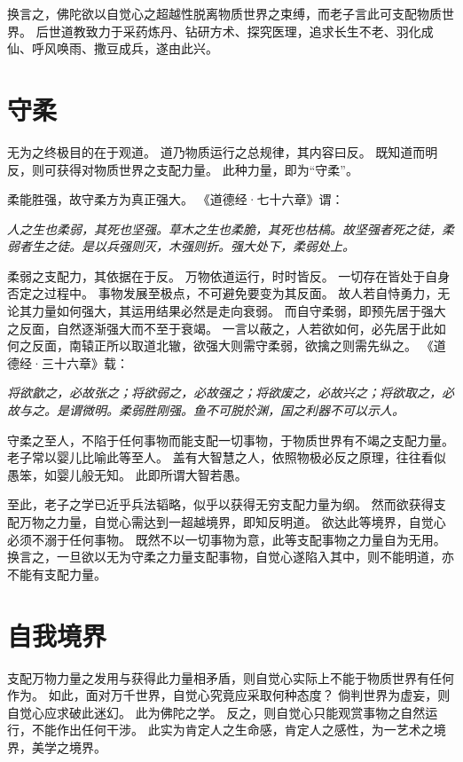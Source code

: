 \documentclass[11pt]{article}
\begin{document}
换言之，佛陀欲以自觉心之超越性脱离物质世界之束缚，而老子言此可支配物质世界。
后世道教致力于采药炼丹、钻研方术、探究医理，追求长生不老、羽化成仙、呼风唤雨、撒豆成兵，遂由此兴。
  
\section{守柔}
无为之终极目的在于观道。
道乃物质运行之总规律，其内容曰反。
既知道而明反，则可获得对物质世界之支配力量。
此种力量，即为“守柔”。

\par

柔能胜强，故守柔方为真正强大。
《道德经·七十六章》谓：

\textit{人之生也柔弱，其死也坚强。草木之生也柔脆，其死也枯槁。故坚强者死之徒，柔弱者生之徒。是以兵强则灭，木强则折。强大处下，柔弱处上。}

\par

柔弱之支配力，其依据在于反。
万物依道运行，时时皆反。
一切存在皆处于自身否定之过程中。
事物发展至极点，不可避免要变为其反面。
故人若自恃勇力，无论其力量如何强大，其运用结果必然是走向衰弱。
而自守柔弱，即预先居于强大之反面，自然逐渐强大而不至于衰竭。
一言以蔽之，人若欲如何，必先居于此如何之反面，南辕正所以取道北辙，欲强大则需守柔弱，欲擒之则需先纵之。
《道德经·三十六章》载：

\textit{将欲歙之，必故张之；将欲弱之，必故强之；将欲废之，必故兴之；将欲取之，必故与之。是谓微明。柔弱胜刚强。鱼不可脱於渊，国之利器不可以示人。}
  
\par

守柔之至人，不陷于任何事物而能支配一切事物，于物质世界有不竭之支配力量。
老子常以婴儿比喻此等至人。
盖有大智慧之人，依照物极必反之原理，往往看似愚笨，如婴儿般无知。
此即所谓大智若愚。

\par

至此，老子之学已近乎兵法韬略，似乎以获得无穷支配力量为纲。
然而欲获得支配万物之力量，自觉心需达到一超越境界，即知反明道。
欲达此等境界，自觉心必须不溺于任何事物。
既然不以一切事物为意，此等支配事物之力量自为无用。
换言之，一旦欲以无为守柔之力量支配事物，自觉心遂陷入其中，则不能明道，亦不能有支配力量。

\section{自我境界}
支配万物力量之发用与获得此力量相矛盾，则自觉心实际上不能于物质世界有任何作为。
如此，面对万千世界，自觉心究竟应采取何种态度？
倘判世界为虚妄，则自觉心应求破此迷幻。
此为佛陀之学。
反之，则自觉心只能观赏事物之自然运行，不能作出任何干涉。
此实为肯定人之生命感，肯定人之感性，为一艺术之境界，美学之境界。
\end{document}
